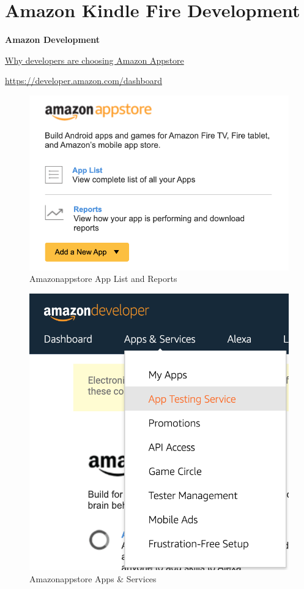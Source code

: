 \chapter{Amazon Kindle Fire Development}
\label{appendix-kindle-fire-development}

\textbf{Amazon Development}

\href{https://developer.amazon.com/apps-and-games}{Why developers are choosing Amazon Appstore}

\url{https://developer.amazon.com/dashboard}

\begin{figure}
    \centering
    \includegraphics{images/amazonappstore/ad-app-list-reports-2021-01-07.png}
    \caption{Amazonappstore App List and Reports}
    \label{fig:amazonappstore-app-list-reports}
\end{figure}

\begin{figure}
    \centering
    \includegraphics{images/amazonappstore/ad-apps-and-services-2021-01-07.png}
    \caption{Amazonappstore Apps \& Services}
    \label{fig:amazonappstore-apps-and-services}
\end{figure}

